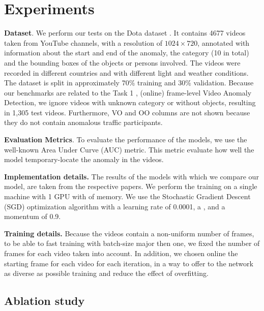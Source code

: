 \section{Experiments}
\label{sec:experiments}

\noindent\textbf{Dataset}.
We perform our tests on the Dota dataset \cite{9712446}.
It contains 4677 videos taken from YouTube channels, with a resolution of $1024 \times 720$, annotated with information about the start and end of the anomaly, the category (10 in total) and the bounding boxes of the objects or persons involved.
The videos were recorded in different countries and with different light and weather conditions.
The dataset is split in approximately $70\%$ training and $30\%$ validation.
Because our benchmarks are related to the Task 1 \cite{9712446}, (online) frame-level Video Anomaly Detection, we ignore videos with unknown category or without objects, resulting in 1,305 test videos.
Furthermore, VO and OO columns are not shown because they do not contain anomalous traffic participants.

\noindent\textbf{Evaluation Metrics}.
To evaluate the performance of the models, we use the well-known Area Under Curve (AUC) metric.
This metric evaluate how well the model temporary-locate the anomaly in the videos.

\noindent\textbf{Implementation details.}
The results of the models with which we compare our model, are taken from the respective papers.
We perform the training on a single machine with 1  GPU with  of memory.
We use the Stochastic Gradient Descent (SGD) optimization algorithm with a learning rate of 0.0001, a , and a momentum of 0.9.

\noindent\textbf{Training details.}
Because the videos contain a non-uniform number of frames, to be able to fast training with batch-size major then one, we fixed the number of frames for each video taken into account.
In addition, we chosen online the starting frame for each video for each iteration, in a way to offer to the network as diverse as possible training and reduce the effect of overfitting.

\subsection{Ablation study}

